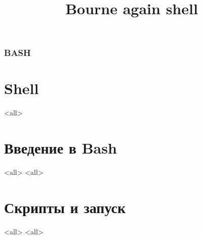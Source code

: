 
\title[bash]{Bourne again shell}




\begin{frame}
	\frametitle{BASH}
	\titlepage
	\vspace{-0.5cm}
	\begin{center}
	\end{center}
\end{frame}

\begin{frame}
	\tableofcontents
\end{frame}




\section{Shell}
\mode<all>{}

\section[Bash intro]{Введение в Bash}
\mode<all>{}
\mode<all>{}

\section[Runtime]{Скрипты и запуск}

\mode<all>{}
\mode<all>{}



